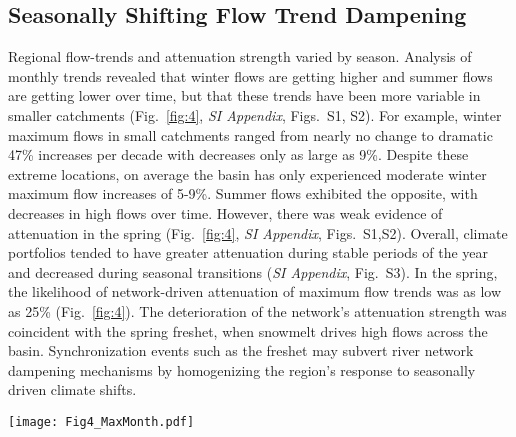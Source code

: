 \documentclass[9pt,twocolumn,twoside,lineno]{pnas-new}
\begin{document}
\subsection*{Seasonally Shifting Flow Trend Dampening} Regional flow-trends and attenuation strength varied by season. Analysis of monthly trends revealed that winter flows are getting higher and summer flows are getting lower over time, but that these trends have been more variable in smaller catchments (Fig.~\ref{fig:4}, \textit{SI Appendix}, Figs.~S1, S2). For example, winter maximum flows in small catchments ranged from nearly no change to dramatic 47\% increases per decade with decreases only as large as 9\%. Despite these extreme locations, on average the basin has only experienced moderate winter maximum flow increases of 5-9\%. Summer flows exhibited the opposite, with decreases in high flows over time. However, there was weak evidence of attenuation in the spring (Fig.~\ref{fig:4}, \textit{SI Appendix}, Figs.~S1,S2). Overall, climate portfolios tended to have greater attenuation during stable periods of the year and decreased during seasonal transitions (\textit{SI Appendix}, Fig.~S3). In the spring, the likelihood of network-driven attenuation of maximum flow trends was as low as 25\% (Fig.~\ref{fig:4}). The deterioration of the network's attenuation strength was coincident with the spring freshet, when snowmelt drives high flows across the basin. Synchronization events such as the freshet may subvert river network dampening mechanisms by homogenizing the region's response to seasonally driven climate shifts.
 
\begin{figure*}[h]
\centering
\texttt{[image: Fig4\_MaxMonth.pdf]}
	\caption{Monthly maximum flow trend attenuation within the Fraser River basin. (\textbf{Left}) Fraser River's basin-wide maximum-flow trend estimates (i.e., intercept = vertical grey lines) by month with density distributions of null-model simulations. Observed values falling further from the center of the density distribution suggest greater evidence for changes in maximum flow and a greater shift in magnitude. (\textbf{Center}) Observed monthly Fraser River maximum-flow variance exponent ($\hat{\updelta}$, blue) and associated density distribution of simulated $\hat{\updelta}$ estimates. Decimal values represent the percent of simulated data exhibiting weaker attenuation (yellow) than observed. (\textbf{Right}) Trend estimates $\pm$ one standard error (SE, grey) plotted against watershed area (km\textsuperscript{2}), colored by climate portfolio strength (green = small, blue = large), for four seasonally representative months. These reflect months in the prior columns and describe the variation in percent change per decade of maximum flow among sites. Simulated lines ignore variance in the intercept and slope to focus visually on attenuation.}
\label{fig:4}
\end{figure*}
\end{document}
